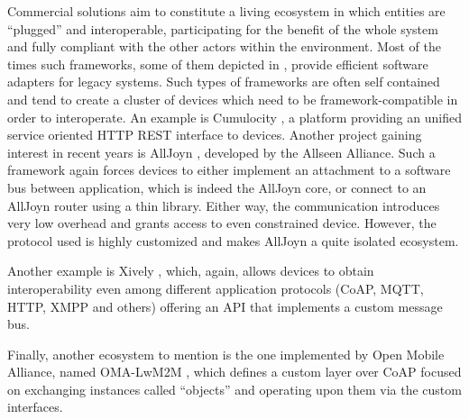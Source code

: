 Commercial solutions aim to constitute a living ecosystem in which entities are ``plugged'' and interoperable, participating for the benefit of the whole system and fully compliant with the other actors within the environment.
Most of the times such frameworks, some of them depicted in \cite{derhamy2015survey}, provide efficient software adapters for legacy systems.
Such types of frameworks are often self contained and tend to create a cluster of devices which need to be framework-compatible in order to interoperate.
An example is Cumulocity \cite{cumulocity}, a platform providing an unified service oriented HTTP REST interface to devices.
Another project gaining interest in recent years is AllJoyn \cite{alljoyn}, developed by the Allseen Alliance.
Such a framework again forces devices to either implement an attachment to a software bus between application, which is indeed the AllJoyn core, or connect to an AllJoyn router using a thin library.
Either way, the communication introduces very low overhead and grants access to even constrained device.
However, the protocol used is highly customized and makes AllJoyn a quite isolated ecosystem.

Another example is Xively \cite{xively}, which, again, allows devices to obtain interoperability even among different application protocols (CoAP, MQTT, HTTP, XMPP and others) offering an API that implements a custom message bus.

Finally, another ecosystem to mention is the one implemented by Open Mobile Alliance, named OMA-LwM2M \cite{omalwm2m}, which defines a custom layer over CoAP focused on exchanging instances called ``objects'' and operating upon them via the custom interfaces.